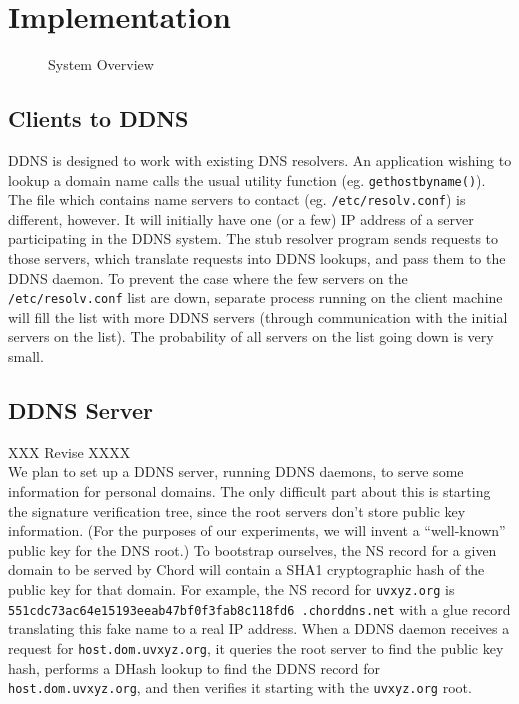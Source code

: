 \section{Implementation}

\begin{figure}
\caption{System Overview}
\label{fig:system}
\end{figure}

\subsection{Clients to DDNS}

DDNS is designed to work with existing DNS resolvers. 
An application wishing to lookup a domain name calls
the usual utility function (eg. {\tt gethostbyname()}). 
The file which contains name servers to contact 
(eg. {\tt /etc/resolv.conf}) is different, however.
It will initially have one (or a few) IP address of
a server participating in the DDNS system. The stub 
resolver program sends requests to those servers,
which translate requests into DDNS lookups,
and pass them to the DDNS daemon.
To prevent the case where the few servers on the 
{\tt /etc/resolv.conf} list are down, separate process 
running on the client machine will fill the list with
more DDNS servers (through communication with the initial
servers on the list). The probability of all servers
on the list going down is very small.

\subsection{DDNS Server}

XXX Revise XXXX\\
We plan to set up a DDNS server, running DDNS daemons,
to serve some information for personal domains.
The only difficult part about this is starting the signature
verification tree, since the root servers don't store public
key information. (For the purposes of our experiments,
we will invent a ``well-known'' public key for the DNS root.)
To bootstrap ourselves,
the NS record for a given domain to be served
by Chord will contain a SHA1 cryptographic hash of the
public key for that domain.
For example, the NS record for {\tt uvxyz.org}
is {\tt 551cdc73ac64e15193eeab47bf0f3fab8c118fd6
.chorddns.net}
with a glue record translating this fake name to a real IP address.
When a DDNS daemon receives a request for {\tt host.dom.uvxyz.org},
it queries the root server to find the public key hash,
performs a DHash lookup to find the DDNS record for 
{\tt host.dom.uvxyz.org},
and then verifies it starting with the {\tt uvxyz.org} root.

